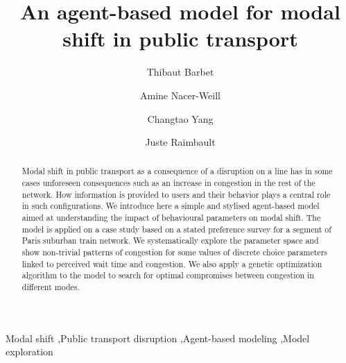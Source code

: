 \documentclass[3p,times,procedia]{elsarticle}
\begin{document}
\begin{frontmatter}


\title{An agent-based model for modal shift in public transport}

\author[a]{Thibaut Barbet}
\author[a]{Amine Nacer-Weill}
\author[a]{Changtao Yang}
\author[b]{Juste Raimbault}

\address[a]{Ecole des Ponts ParisTech, Champs-sur-Marne, France}
\address[b]{CASA, University College London, London, United Kingdom}







\begin{abstract}
Modal shift in public transport as a consequence of a disruption on a line has in some cases unforeseen consequences such as an increase in congestion in the rest of the network. How information is provided to users and their behavior plays a central role in such configurations. We introduce here a simple and stylised agent-based model aimed at understanding the impact of behavioural parameters on modal shift. The model is applied on a case study based on a stated preference survey for a segment of Paris suburban train network. We systematically explore the parameter space and show non-trivial patterns of congestion for some values of discrete choice parameters linked to perceived wait time and congestion. We also apply a genetic optimization algorithm to the model to search for optimal compromises between congestion in different modes.
\end{abstract}

\begin{keyword}
Modal shift \sep Public transport disruption \sep Agent-based modeling \sep Model exploration
\end{keyword}
\end{frontmatter}
\end{document}
